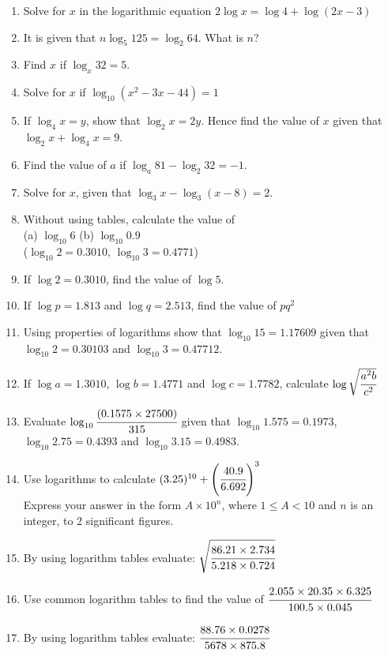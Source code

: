 \begin{enumerate}
	\item Solve for $x$ in the logarithmic equation $2\log x = \log 4 + \log (2x - 3)$
	
	\item It is given that $n\log_5 125 = \log_2 64$. What is $n$?
	
	\item Find $x$ if $\log_x 32 = 5$.
	
	\item Solve for $x$ if $\log_{10} (x^2 - 3x - 44) = 1$
	
	\item If $\log_4 x = y$, show that $\log_2 x = 2y$. Hence find the value of $x$ given that $\log_2 x + \log_4 x = 9$.
	
	\item Find the value of $a$ if $\log_a 81 - \log_2 32 = -1$.
	
	\item Solve for $x$, given that $\log_3 x - \log_3 (x - 8) = 2$.
	
	\item Without using tables, calculate the value of\\
	(a) $\log_{10}6$	(b) $\log_{10}0.9$\\
	($\log_{10}2 = 0.3010$, $\log_{10}3 = 0.4771$)
	
	\item If $\log 2 = 0.3010$, find the value of $\log 5$.
	
	\item If $\log p = 1.813$ and $\log q = 2.513$, find the value of $pq^2$
	
	\item Using properties of logarithms show that $\log_{10} 15 = 1.17609$ given that $\log_{10} 2 = 0.30103$ and $\log_{10} 3 = 0.47712$.
	
	\item If $\log a = 1.3010$, $\log b = 1.4771$ and $\log c = 1.7782$, calculate $\log \sqrt{\cfrac{a^2b}{c^2}}$ 
	
	\item Evaluate $\log_{10} \cfrac{(0.1575 \times 27500)}{315}$ given that $\log_{10} 1.575 = 0.1973$, $\log_{10} 2.75 = 0.4393$ and $\log_{10} 3.15 = 0.4983$.

	\item Use logarithms to calculate $(3.25)^{10} + \left(\cfrac{40.9}{6.692}\right)^3$\\
	Express your answer in the form $A \times 10^n$, where $1 \leq A < 10$ and $n$ is an integer, to 2 significant figures.
	
	\item By using logarithm tables evaluate: $\sqrt{\cfrac{86.21 \times 2.734}{5.218 \times 0.724}}$
	
	\item Use common logarithm tables to find the value of $\cfrac{2.055 \times 20.35 \times 6.325}{100.5 \times 0.045}$
	
	\item By using logarithm tables evaluate: $\cfrac{88.76 \times 0.0278}{5678 \times 875.8}$

\end{enumerate}


